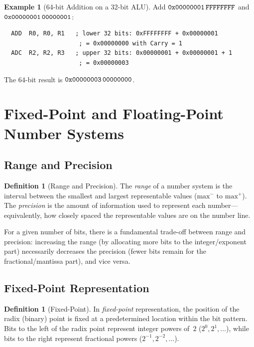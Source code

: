 \documentclass[11pt, a4paper, notitlepage]{report}
\theoremstyle{definition}
\newtheorem{definition}[theorem]{Definition}
\theoremstyle{remark}
\theoremstyle{definition}
\newtheorem{example}[theorem]{Example}
\begin{document}
\begin{example}[64-bit Addition on a 32-bit ALU]
  \label{ex:multi-precision}
  Add $\texttt{0x00000001\,FFFFFFFF}$ and $\texttt{0x00000001\,00000001}$:
  \leavevmode
  \begin{lstlisting}
  ADD  R0, R0, R1   ; lower 32 bits: 0xFFFFFFFF + 0x00000001
                     ; = 0x00000000 with Carry = 1
  ADC  R2, R2, R3   ; upper 32 bits: 0x00000001 + 0x00000001 + 1
                     ; = 0x00000003
  \end{lstlisting}
  The 64-bit result is $\texttt{0x00000003\,00000000}$.
\end{example}


\section{Fixed-Point and Floating-Point Number Systems}
\label{sec:fixed-float}

\subsection{Range and Precision}
\label{sec:range-precision}

\begin{definition}[Range and Precision]
  \label{def:range-precision}
  The \emph{range} of a number system is the interval between the smallest and largest representable values ($\mathrm{max}^-$ to $\mathrm{max}^+$). The \emph{precision} is the amount of information used to represent each number---equivalently, how closely spaced the representable values are on the number line.
\end{definition}

For a given number of bits, there is a fundamental trade-off between range and precision: increasing the range (by allocating more bits to the integer/exponent part) necessarily decreases the precision (fewer bits remain for the fractional/mantissa part), and vice versa.

\subsection{Fixed-Point Representation}
\label{sec:fixed-point}

\begin{definition}[Fixed-Point]
  \label{def:fixed-point}
  In \emph{fixed-point} representation, the position of the radix (binary) point is fixed at a predetermined location within the bit pattern. Bits to the left of the radix point represent integer powers of~$2$ ($2^0, 2^1, \ldots$), while bits to the right represent fractional powers ($2^{-1}, 2^{-2}, \ldots$).
\end{definition}
\end{document}
